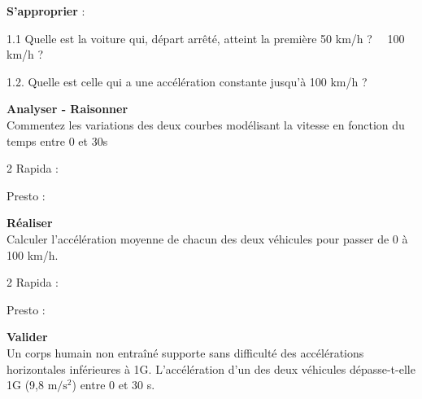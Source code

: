\documentclass[11pt,a4paper]{article}
\newcommand{\cadreblanc}[1]{%
\medskip\framebox[\linewidth][c]{%
\rule{0mm}{#1mm}}\par
\medskip}
\begin{document}
\textbf{ S'approprier} :

1.1 Quelle est la voiture qui, départ arrêté, atteint la première 50 km/h ? ~~100 km/h ? \\

\vspace{8mm}
\dotfill 

\vspace{8mm}
\dotfill 

\vspace{3mm}

1.2. Quelle est celle qui a une accélération constante jusqu'à 100 km/h ? 

\vspace{8mm}
\dotfill 

\vfill 



\textbf{ Analyser - Raisonner} \\

Commentez les variations des deux courbes  modélisant la vitesse en fonction du temps entre 0 et 30s 

\begin{multicols}{2}
    Rapida : \\
    \cadreblanc{22}
    
    Presto : \\
    \cadreblanc{22}
    
\end{multicols}

\vfill 

\textbf{ Réaliser} \\

Calculer l'accélération moyenne de chacun des deux véhicules pour passer de 0 à 100 km/h.  

\vspace{3mm}
\begin{multicols}{2}
    Rapida : \\
    \cadreblanc{30}
    
    Presto : \\
    \cadreblanc{30}
    
\end{multicols}


\vspace{3mm}



\textbf{ Valider} \\

Un corps humain non entraîné supporte sans difficulté des accélérations horizontales inférieures à 1G. L'accélération d'un des deux véhicules dépasse-t-elle 1G (9,8 $\mathrm{m/s^2}$) entre 0 et 30 s. 
\end{document}
